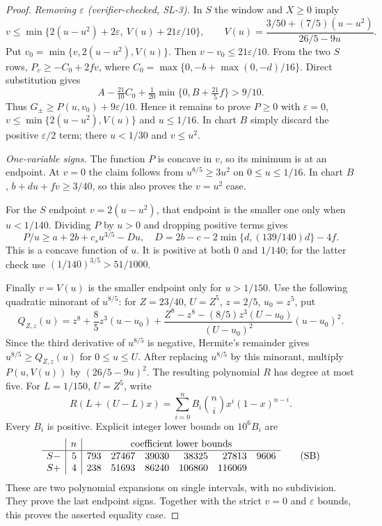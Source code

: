 \begin{proof}
\emph{Removing $\varepsilon$ (verifier-checked, SL-3).}
In $S$ the window and $X\ge0$ imply
\[
v\le\min\{2(u-u^2)+2\varepsilon,\ V(u)+21\varepsilon/10\},\qquad
V(u)=\frac{3/50+(7/5)(u-u^2)}{26/5-9u}.
\]
Put $v_0=\min\{v,2(u-u^2),V(u)\}$. Then $v-v_0\le21\varepsilon/10$.
From the two $S$ rows, $P_v\ge-C_0+2fv$, where
$C_0=\max\{0,-b+\max(0,-d)/16\}$. Direct substitution gives
\[
A-\tfrac{21}{10}C_0+\tfrac1{20}\min\{0,B+\tfrac{21}5f\}>9/10.
\]
Thus $G_\pm\ge P(u,v_0)+9\varepsilon/10$. Hence it remains to prove $P\ge0$ with
$\varepsilon=0$, $v\le\min\{2(u-u^2),V(u)\}$ and $u\le1/16$.
In chart $B$ simply discard the positive $\varepsilon/2$ term;
there $u<1/30$ and $v\le u^2$.

\emph{One-variable signs.}
The function $P$ is concave in $v$, so its minimum is at an endpoint.
At $v=0$ the claim follows from $u^{8/5}\ge3u^2$ on $0\le u\le1/16$. In chart $B$,
$b+du+fv\ge3/40$, so this also proves the $v=u^2$ case.

For the $S$ endpoint $v=2(u-u^2)$, that endpoint is the smaller one
only when $u<1/140$. Dividing $P$ by $u>0$ and dropping positive terms gives
\[
P/u\ge a+2b+c_su^{3/5}-Du,\quad
D=2b-c-2\min\{d,(139/140)d\}-4f.
\]
This is a concave function of $u$. It is positive at both $0$ and $1/140$;
for the latter check use $(1/140)^{3/5}>51/1000$.

Finally $v=V(u)$ is the smaller endpoint only for $u>1/150$.
Use the following quadratic minorant of $u^{8/5}$:
for $Z=23/40$, $U=Z^5$, $z=2/5$, $u_0=z^5$, put
\[
Q_{Z,z}(u)=z^8+\frac85z^3(u-u_0)
+\frac{Z^8-z^8-(8/5)z^3(U-u_0)}{(U-u_0)^2}(u-u_0)^2.
\tag{SQ}\label{eq:fqe-sliver-quadratic}
\]
Since the third derivative of $u^{8/5}$ is negative,
Hermite's remainder gives $u^{8/5}\ge Q_{Z,z}(u)$ for $0\le u\le U$.
After replacing $u^{8/5}$ by this minorant, multiply $P(u,V(u))$
by $(26/5-9u)^2$. The resulting polynomial $R$ has degree at most five.
For $L=1/150$, $U=Z^5$, write
\[
R(L+(U-L)x)=\sum_{i=0}^n B_i\binom ni x^i(1-x)^{n-i}.
\]
Every $B_i$ is positive. Explicit integer lower bounds on $10^6 B_i$ are
\[
\begin{array}{c|r|rrrrrr}
&n&\multicolumn{6}{c}{\text{coefficient lower bounds}}\\\hline
S-&5&793&27467&39030&38325&27813&9606\\
S+&4&238&51693&86240&106860&116069&
\end{array}
\tag{SB}\label{eq:fqe-sliver-bernstein}
\]
These are two polynomial expansions on single intervals, with no
subdivision. They prove the last endpoint signs. Together with the
strict $v=0$ and $\varepsilon$ bounds, this proves the asserted equality case.
\end{proof}


